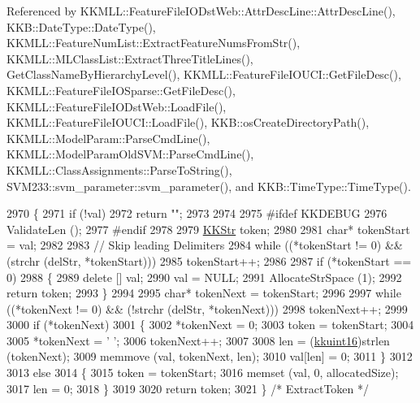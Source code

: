 Referenced by K\+K\+M\+L\+L\+::\+Feature\+File\+I\+O\+Dst\+Web\+::\+Attr\+Desc\+Line\+::\+Attr\+Desc\+Line(), K\+K\+B\+::\+Date\+Type\+::\+Date\+Type(), K\+K\+M\+L\+L\+::\+Feature\+Num\+List\+::\+Extract\+Feature\+Nums\+From\+Str(), K\+K\+M\+L\+L\+::\+M\+L\+Class\+List\+::\+Extract\+Three\+Title\+Lines(), Get\+Class\+Name\+By\+Hierarchy\+Level(), K\+K\+M\+L\+L\+::\+Feature\+File\+I\+O\+U\+C\+I\+::\+Get\+File\+Desc(), K\+K\+M\+L\+L\+::\+Feature\+File\+I\+O\+Sparse\+::\+Get\+File\+Desc(), K\+K\+M\+L\+L\+::\+Feature\+File\+I\+O\+Dst\+Web\+::\+Load\+File(), K\+K\+M\+L\+L\+::\+Feature\+File\+I\+O\+U\+C\+I\+::\+Load\+File(), K\+K\+B\+::os\+Create\+Directory\+Path(), K\+K\+M\+L\+L\+::\+Model\+Param\+::\+Parse\+Cmd\+Line(), K\+K\+M\+L\+L\+::\+Model\+Param\+Old\+S\+V\+M\+::\+Parse\+Cmd\+Line(), K\+K\+M\+L\+L\+::\+Class\+Assignments\+::\+Parse\+To\+String(), S\+V\+M233\+::svm\+\_\+parameter\+::svm\+\_\+parameter(), and K\+K\+B\+::\+Time\+Type\+::\+Time\+Type().


\begin{DoxyCode}
2970 \{
2971   \textcolor{keywordflow}{if}  (!val)
2972      \textcolor{keywordflow}{return}  \textcolor{stringliteral}{""};
2973   
2974 
2975 \textcolor{preprocessor}{  #ifdef  KKDEBUG}
2976   ValidateLen ();
2977 \textcolor{preprocessor}{  #endif}
2978 
2979   \hyperlink{class_k_k_b_1_1_k_k_str}{KKStr}  token;
2980   
2981   \textcolor{keywordtype}{char}*  tokenStart = val;
2982   
2983   \textcolor{comment}{// Skip leading Delimiters}
2984   \textcolor{keywordflow}{while}  ((*tokenStart  != 0)  &&  (strchr (delStr, *tokenStart)))
2985      tokenStart++;
2986 
2987   \textcolor{keywordflow}{if}  (*tokenStart == 0)
2988   \{
2989     \textcolor{keyword}{delete}  [] val;
2990     val = NULL;
2991     AllocateStrSpace (1);
2992     \textcolor{keywordflow}{return}  token;
2993   \}
2994 
2995   \textcolor{keywordtype}{char}*  tokenNext = tokenStart;
2996 
2997   \textcolor{keywordflow}{while}  ((*tokenNext != 0)  &&  (!strchr (delStr, *tokenNext)))
2998      tokenNext++;
2999   
3000   \textcolor{keywordflow}{if}  (*tokenNext)
3001   \{
3002     *tokenNext = 0;
3003     token = tokenStart;
3004 
3005     *tokenNext = \textcolor{charliteral}{' '};
3006     tokenNext++;
3007 
3008     len = (\hyperlink{namespace_k_k_b_aa8c7d4d30381c8a0b6fce68974a9c8a9}{kkuint16})strlen (tokenNext);
3009     memmove (val, tokenNext, len);
3010     val[len] = 0;
3011   \}
3012   
3013   \textcolor{keywordflow}{else}
3014   \{
3015     token = tokenStart;
3016     memset (val, 0, allocatedSize);
3017     len = 0;
3018   \}   
3019 
3020   \textcolor{keywordflow}{return}  token;
3021 \} \textcolor{comment}{/* ExtractToken */}
\end{DoxyCode}
